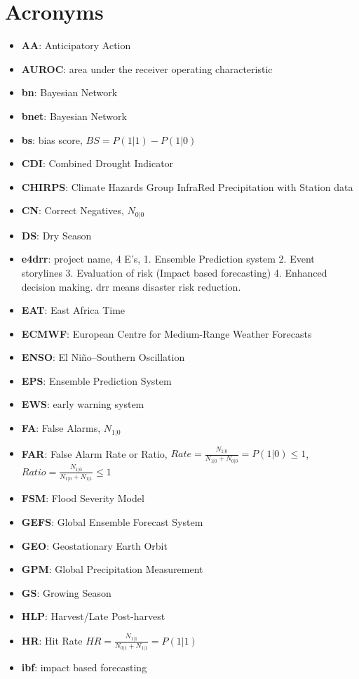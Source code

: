 \documentclass{article}
\begin{document}
\section*{Acronyms}
\begin{itemize}
\item {\bf AA}: Anticipatory Action
\item {\bf AUROC}: area under the receiver operating characteristic
\item {\bf bn}: Bayesian Network
\item {\bf bnet}: Bayesian Network
\item {\bf bs}: bias score, $BS = P(1|1)-P(1|0)$
\item {\bf CDI}: Combined Drought Indicator
\item {\bf CHIRPS}: Climate Hazards Group InfraRed Precipitation with Station data
\item {\bf CN}: Correct Negatives, $N_{0|0}$
\item {\bf DS}: Dry Season
\item {\bf e4drr}: project name, 4 E's, 1. Ensemble Prediction system 2. Event storylines 3. Evaluation of risk (Impact based forecasting) 4. Enhanced decision making. drr means disaster risk reduction.
\item {\bf EAT}: East Africa Time
\item {\bf ECMWF}: European Centre for Medium-Range Weather Forecasts
\item {\bf ENSO}: El Niño–Southern Oscillation
\item {\bf EPS}: Ensemble Prediction System
\item {\bf EWS}: early warning system
\item {\bf FA}: False Alarms, $N_{1|0}$
\item {\bf FAR}: False Alarm Rate or Ratio, $Rate=\frac{N_{1|0}}{N_{1|0} + N_{0|0}}=P(1|0)\leq 1$, $Ratio=\frac{N_{1|0}}{N_{1|0} + N_{1|1}}\leq 1$
\item {\bf FSM}: Flood Severity Model
\item {\bf GEFS}: Global Ensemble Forecast System
\item {\bf GEO}: Geostationary Earth Orbit
\item {\bf GPM}: Global Precipitation Measurement
\item {\bf GS}: Growing Season
\item {\bf HLP}: Harvest/Late Post-harvest
\item {\bf HR}: Hit Rate $HR=\frac{N_{1|1}}{N_{0|1} + N_{1|1}}=P(1|1)$
\item {\bf ibf}: impact based forecasting

\end{itemize}
\end{document}
